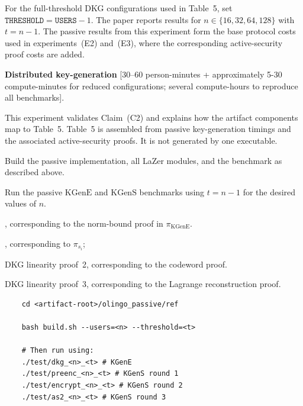 \documentclass[nonacm,sigconf]{acmart}
\begin{document}
\begin{compactitem}
\begin{asparadesc}
For the full-threshold DKG configurations used in Table~5, set $\texttt{THRESHOLD}=\texttt{USERS}-1$. The paper reports results for $n\in\{16,32,64,128\}$ with $t=n-1$. The passive results from this experiment form the base protocol costs used in experiments~(E2) and~(E3), where the corresponding active-security proof costs are added.
\end{asparadesc}

  \item[(E2):] \textbf{Distributed key-generation} [30--60 person-minutes + approximately 5-30 compute-minutes for reduced configurations; several compute-hours to reproduce all benchmarks].

  This experiment validates Claim~(C2) and explains how the artifact components map to Table~5. Table~5 is assembled from passive key-generation timings and the associated active-security proofs. It is not generated by one executable.

  \begin{asparadesc}
    \item[Preparation:] Build the passive implementation, all LaZer modules, and the  benchmark as described above.

    \item[Execution:] Run the passive $\mathrm{KGenE}$ and $\mathrm{KGenS}$ benchmarks using $t=n-1$ for the desired values of $n$.

    \begin{compactitem}
      \item {}, corresponding to the norm-bound proof in $\pi_{\mathrm{KGenE}}$.
      \item {}, corresponding to $\pi_{s_i}$;
      \item DKG linearity proof~2, corresponding to the codeword proof.
      \item DKG linearity proof~3, corresponding to the Lagrange reconstruction proof.
    \end{compactitem}

    \begin{verbatim}
    cd <artifact-root>/olingo_passive/ref

    bash build.sh --users=<n> --threshold=<t>

    # Then run using:
    ./test/dkg_<n>_<t> # KGenE
    ./test/preenc_<n>_<t> # KGenS round 1
    ./test/encrypt_<n>_<t> # KGenS round 2
    ./test/as2_<n>_<t> # KGenS round 3
    \end{verbatim}


\end{asparadesc}
\end{compactitem}
\end{document}
